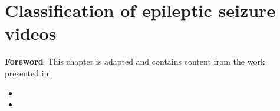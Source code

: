 \chapter[Classification of epileptic seizure videos]{Classification of epileptic seizure videos}

\label{chap:videos}

\minitoc

\acresetall
\begin{center}
  \begin{minipage}[b]{0.9\linewidth}
    \small
    \textbf{Foreword\,}
    This chapter is adapted and contains content from the work presented in:
    \begin{itemize}
      \item {}
      \item {}
    \end{itemize}
  \end{minipage}
\end{center}



\acresetall
\bodyspacing





\onehalfspacing %
